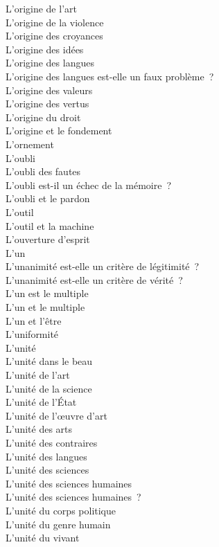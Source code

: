 \documentclass[a4paper,12pt]{article}
\begin{document}
L'origine de l'art \\
L'origine de la violence \\
L'origine des croyances \\
L'origine des idées \\
L'origine des langues \\
L'origine des langues est-elle un faux problème ? \\
L'origine des valeurs \\
L'origine des vertus \\
L'origine du droit \\
L'origine et le fondement \\
L'ornement \\
L'oubli \\
L'oubli des fautes \\
L'oubli est-il un échec de la mémoire ? \\
L'oubli et le pardon \\
L'outil \\
L'outil et la machine \\
L'ouverture d'esprit \\
L'un \\
L'unanimité est-elle un critère de légitimité ? \\
L'unanimité est-elle un critère de vérité ? \\
L'un est le multiple \\
L'un et le multiple \\
L'un et l'être \\
L'uniformité \\
L'unité \\
L'unité dans le beau \\
L'unité de l'art \\
L'unité de la science \\
L'unité de l'État \\
L'unité de l'œuvre d'art \\
L'unité des arts \\
L'unité des contraires \\
L'unité des langues \\
L'unité des sciences \\
L'unité des sciences humaines \\
L'unité des sciences humaines ? \\
L'unité du corps politique \\
L'unité du genre humain \\
L'unité du vivant \\
\end{document}
